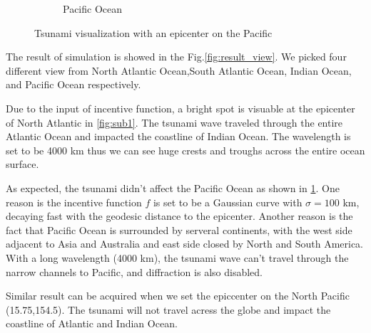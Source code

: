 \documentclass[a4paper]{article}
\begin{document}
\begin{figure}
\begin{subfigure}[b]{0.475\textwidth}
        \caption[]%
        {{\small Pacific Ocean}}    
        \label{fig:sub4}
    \end{subfigure}
    \caption[ ]
    {\small Tsunami visualization with an epicenter on the Pacific} 
    \label{fig:result_view_2}
\end{figure}


The result of simulation is showed in the Fig.\ref{fig:result_view}. We picked four 
different view from North Atlantic Ocean,South Atlantic Ocean, Indian Ocean, and Pacific Ocean
respectively.

Due to the input of incentive function, a bright spot 
is visuable at the epicenter of North Atlantic in \ref{fig:sub1}. The tsunami wave traveled through the
entire Atlantic Ocean and impacted the coastline of Indian Ocean.
The wavelength is set to be 4000 km thus we can see huge crests and 
troughs across the entire ocean surface.

As expected, the tsunami didn't affect the Pacific Ocean as shown in \ref{fig:sub4}. One reason is the incentive
function $f$ is set to be a Gaussian curve with $\sigma=100$ km, decaying fast with the geodesic distance to the epicenter.
Another reason is the fact that Pacific Ocean is surrounded by serveral continents, with the 
west side adjacent to Asia and Australia and east side closed by North and South America. 
With a long wavelength (4000 km), the tsunami wave can't travel through the narrow channels to Pacific,
and diffraction is also disabled.

Similar result can be acquired when we set the epiccenter on the North Pacific (15.75,154.5).
The tsunami will not travel acress the globe and impact the coastline of Atlantic and Indian Ocean.


\end{document}
